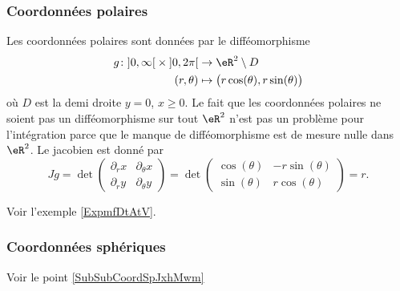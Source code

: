 					\subsubsection{Coordonnées polaires}

Les coordonnées polaires sont données par le difféomorphisme
\begin{equation}
	\begin{aligned}
		g\colon \mathopen]0,\infty\mathclose[\times\mathopen]0,2\pi\mathclose[ &\to\eR^2\setminus D\\
		(r,\theta)&\mapsto \big( r\cos(\theta),r\sin(\theta) \big)
	\end{aligned}
\end{equation}
où $D$ est la demi droite $y=0$, $x\geq 0$. Le fait que les coordonnées polaires ne soient pas un difféomorphisme sur tout $\eR^2$ n'est pas un problème pour l'intégration parce que le manque de difféomorphisme est de mesure nulle dans $\eR^2$. Le jacobien est donné par
\begin{equation}
	Jg=\det\begin{pmatrix}
	\partial_rx	&	\partial_{\theta}x	\\ 
	\partial_ry	&	\partial_{\theta}y
\end{pmatrix}=\det\begin{pmatrix}
	\cos(\theta)	&	-r\sin(\theta)	\\ 
	\sin(\theta)	&	r\cos(\theta)	
\end{pmatrix}=r.
\end{equation}

Voir l'exemple \ref{ExpmfDtAtV}.

\subsubsection{Coordonnées sphériques}

Voir le point \ref{SubSubCoordSpJxhMwm}


